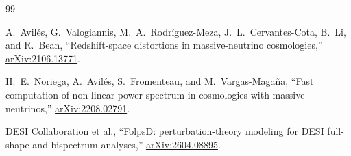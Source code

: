 \documentclass[11pt,a4paper]{article}
\begin{document}
\begin{thebibliography}{99}

A.~Avil\'es, G.~Valogiannis, M.~A.~Rodr\'iguez-Meza, J.~L.~Cervantes-Cota, B.~Li, and R.~Bean,
``Redshift-space distortions in massive-neutrino cosmologies,''
\href{https://arxiv.org/abs/2106.13771}{arXiv:2106.13771}.

H.~E.~Noriega, A.~Avil\'es, S.~Fromenteau, and M.~Vargas-Maga\~na,
``Fast computation of non-linear power spectrum in cosmologies with massive neutrinos,''
\href{https://arxiv.org/abs/2208.02791}{arXiv:2208.02791}.

DESI Collaboration et al.,
``FolpsD: perturbation-theory modeling for DESI full-shape and bispectrum analyses,''
\href{https://arxiv.org/abs/2604.08895}{arXiv:2604.08895}.

\end{thebibliography}
\end{document}

